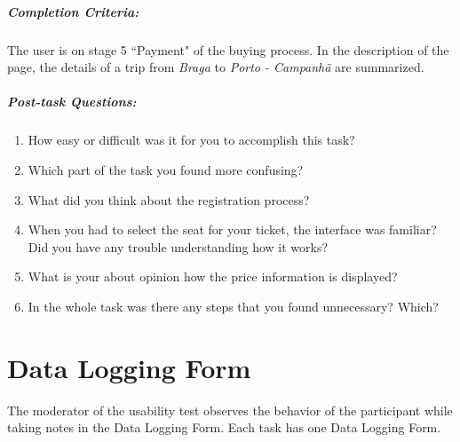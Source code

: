 \documentclass[a4paper]{article}
\begin{document}
\subparagraph{Completion Criteria:} The user is on stage 5 ``Payment" of the buying process. In the description of the page, the details of a trip from \textit{Braga} to \textit{Porto - Campanhã} are summarized.

\subparagraph{Post-task Questions:}

\begin{enumerate}[label=4.\theenumi{}.]
  \item How easy or difficult was it for you to accomplish this task?
  \item Which part of the task you found more confusing?
  \item What did you think about the registration process?
  \item When you had to select the seat for your ticket, the interface was familiar? Did you have any trouble understanding how it works?
  \item What is your about opinion how the price information is displayed?
  \item In the whole task was there any steps that you found unnecessary? Which?
\end{enumerate}

\section{Data Logging Form}

The moderator of the usability test observes the behavior of the participant while taking notes in the Data Logging Form. Each task has one Data Logging Form.







\end{document}
